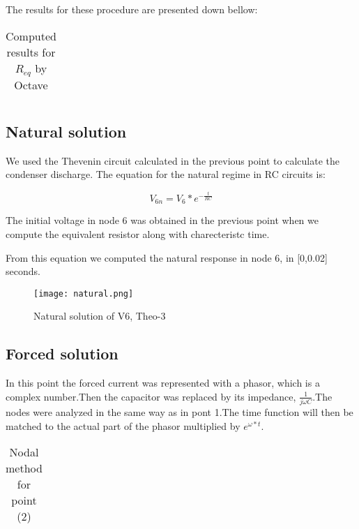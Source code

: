 The results for these procedure are presented down bellow: 

\vspace{0.2cm}
\FloatBarrier
\begin{table}[h]
  \centering
  \begin{tabular}{|c|c|c|c|c|c|c|}
	\hline
    
	\hline
  \end{tabular}
  \caption{Computed results for $R_{eq}$  by Octave }
  \label{tab:nodal}
\end{table}
\FloatBarrier 
  
 
\subsection{Natural solution} 

We used the Thevenin circuit calculated in the previous point to calculate the condenser discharge. The equation for the natural regime in RC circuits is: 

\begin{equation}
  V_{6n}=V_6*e^{-\frac{t}{RC}}
  \label{eq:kvl}
\end{equation}   

The initial voltage in node 6 was obtained in the previous point when we compute the equivalent resistor along with charecteristc time. 

From this equation we computed the natural response in node 6, in [0,0.02] seconds.  
\FloatBarrier
\begin{figure}
  \texttt{[image: natural.png]}
  \caption{Natural solution of V6, Theo-3}
  \label{fig:natural}
\end{figure}
\FloatBarrier

\subsection{Forced solution} 

In this point the forced current was represented with a phasor, which is a complex number.Then the capacitor was replaced by its impedance, $\frac{1}{j\omega C}$.The nodes were analyzed in the same way as in pont 1.The time function will then be matched to the actual part of the phasor multiplied by $e^{\omega*t}$. 


\vspace{0.2cm}
\FloatBarrier
\begin{table}[h]
  \centering
  \begin{tabular}{|c|c|}
   \hline
    
	\hline
  \end{tabular}
  \caption{Nodal method for point (2)}
  \label{tab:nodal}
\end{table}
\FloatBarrier  


